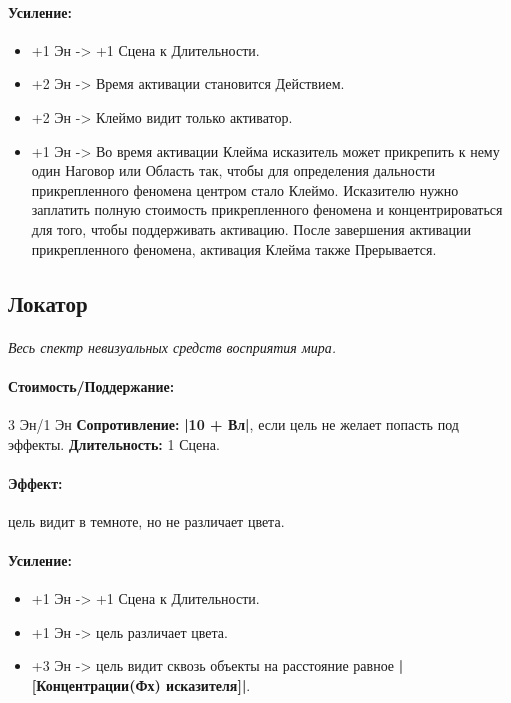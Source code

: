 \paragraph{Усиление:}
\begin{itemize}
\item+1 Эн -> +1 Сцена к Длительности.
\item+2 Эн -> Время активации становится Действием.
\item+2 Эн -> Клеймо видит только активатор.
\item+1 Эн -> Во время активации Клейма исказитель может прикрепить к нему один Наговор или Область так, чтобы для определения дальности прикрепленного феномена центром стало Клеймо. Исказителю нужно заплатить полную стоимость прикрепленного феномена и концентрироваться для того, чтобы поддерживать активацию. После завершения активации прикрепленного феномена, активация Клейма также Прерывается.
\end{itemize}
\subsection{Локатор}
\paragraph{} 
\textit{Весь спектр невизуальных средств восприятия мира.}
\paragraph{Стоимость/Поддержание: }3 Эн/1 Эн
\newline
\textbf{Сопротивление: }
\textbf{|10 + Вл|}, если цель не желает попасть под эффекты.
\newline 
\textbf{Длительность: }1 Сцена.
\paragraph{Эффект: }цель видит в темноте, но не различает цвета.
\paragraph{Усиление:}
\begin{itemize}
\item+1 Эн -> +1 Сцена к Длительности.
\item+1 Эн -> цель различает цвета.
\item+3 Эн -> цель видит сквозь объекты на расстояние равное 
\textbf{|[Концентрации(Фх) исказителя]|}.
\end{itemize}
